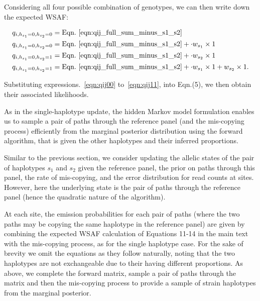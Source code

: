 \documentclass{article}
\begin{document}
\noindent Considering all four possible combination of genotypes, we can then write down the expected WSAF:

\begin{align}
q_{i,h_{s_1}=0,h_{s_2}=0} & = \textrm{Eqn.~\eqref{eqn:qij_full_sum_minus_s1_s2}} \label{eqn:qij00}\\
q_{i,h_{s_1}=0,h_{s_2}=0} & = \textrm{Eqn.~\eqref{eqn:qij_full_sum_minus_s1_s2}} + \cdot w_{s_1} \times 1 \label{eqn:qij10}\\
q_{i,h_{s_1}=0,h_{s_2}=1} & = \textrm{Eqn.~\eqref{eqn:qij_full_sum_minus_s1_s2}} + \cdot w_{s_2} \times 1 \label{eqn:qij01}\\
q_{i,h_{s_1}=0,h_{s_2}=1} & = \textrm{Eqn.~\eqref{eqn:qij_full_sum_minus_s1_s2}} + \cdot w_{s_1} \times 1 + w_{s_2} \times 1 \label{eqn:qij11}.
\end{align}

\noindent Substituting expressions.~\eqref{eqn:qij00} to~\eqref{eqn:qij11}, into Eqn.(5), we then obtain their associated likelihoods.

As in the single-haplotype update, the hidden Markov model formulation enables us to sample a pair of paths through the reference panel (and the mis-copying process) efficiently from the marginal posterior distribution using the forward algorithm, that is given the other haplotypes and their inferred proportions.


Similar to the previous section, we consider updating the allelic states of the pair of haplotypes $s_1$ and $s_2$ given the reference panel, the prior on paths through this panel, the rate of mis-copying, and the error distribution for read counts at sites.  However, here the underlying state is the pair of paths through the reference panel (hence the quadratic nature of the algorithm).

At each site, the emission probabilities for each pair of paths (where the two paths may be copying the same haplotype in the reference panel) are given by combining the expected WSAF calculation of Equations 11-14 in the main text with the mis-copying process, as for the single haplotype case.  For the sake of brevity we omit the equations as they follow naturally, noting that the two haplotypes are not exchangeable due to their having different proportions.  As above, we complete the forward matrix, sample a pair of paths through the matrix and then the mis-copying process to provide a sample of strain haplotypes from the marginal posterior.
\end{document}
